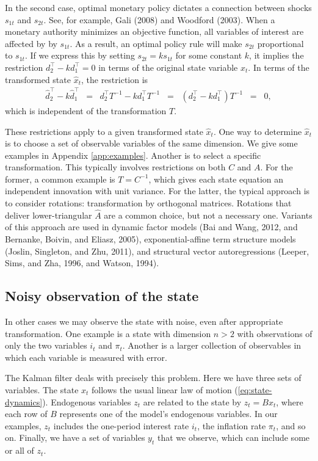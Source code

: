 \documentclass[12pt]{article}
\begin{document}
{In the second case, optimal monetary policy dictates a connection between
shocks $s_{1t}$ and $s_{2t}$.
See, for example, Gali (2008) and Woodford (2003).  %
When a monetary authority minimizes an objective function,
all variables of interest are affected by by $s_{1t}$.
As a result, an optimal policy rule will make $s_{2t}$ proportional to $s_{1t}$.
If we express this by setting $s_{2t} = k s_{1t}$ for some constant $k$,
it implies the restriction $ d_2^\top - k d_1^\top = 0$ in terms of the original
state variable $x_t$.
In terms of the transformed state $\hat{x}_t$, the restriction is
\begin{eqnarray*}
    \hat{d}_2^{\top} - k \hat{d}_1^{\top}
            &=& d_2^\top T^{-1}- k d_1^\top T^{-1}
            \;\;=\;\; (d_2^\top - k d_1^\top) T^{-1}
            \;\;=\;\; 0,
\end{eqnarray*}
which is independent of the transformation $T$.

These restrictions apply to a given transformed state $\hat{x}_t$.
One way to determine $\hat{x}_t$ is to choose a set of observable variables of the same dimension.
We give some examples in Appendix \ref{app:examples}.
Another is to select a specific transformation.
This typically involves restrictions on both $C$ and $A$.
For the former, a common example is $ T = C^{-1}$,
which gives each state equation an independent innovation with unit variance.
For the latter, the typical approach is to consider rotations:
transformation by orthogonal matrices.
Rotations that deliver lower-triangular $\widehat{A}$ are a common choice,
but not a necessary one.
Variants of this approach are used in
dynamic factor models (Bai and Wang, 2012, and Bernanke, Boivin, and Eliasz, 2005),
exponential-affine term structure models (Joslin, Singleton, and Zhu, 2011),
and structural vector autoregressions
(Leeper, Sims, and Zha, 1996, and Watson, 1994).


\subsection{Noisy observation of the state}

In other cases we may observe the state with noise,
even after appropriate transformation.
One example is a state with dimension $n>2$
with observations of only the two variables $i_t$ and $\pi_t$.
Another is a larger collection of observables
in which each variable is measured with error.

The Kalman filter deals with precisely this problem.
Here we have three sets of variables.
The state $x_t$ follows
the usual linear law of motion (\ref{eq:state-dynamics}).
Endogenous variables $z_t$ are related to the state by $ z_t = B x_t$,
where each row of $B$ represents one of the model's endogenous variables.
In our examples, $z_t$ includes the one-period interest rate $i_t$,
the inflation rate $\pi_t$, and so on.
Finally, we have a set of variables $y_t$ that we observe,
which can include some or all of $z_t$.

}
\end{document}
